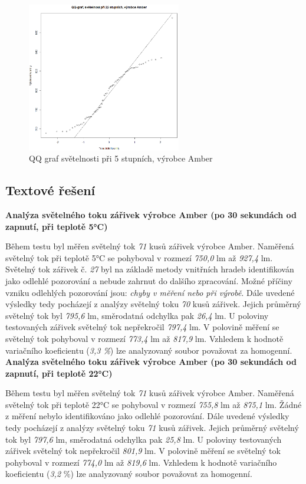 \documentclass[czech]{article}%
\begin{document}
\begin{figure}[H]
	\centering
	\includegraphics[width=0.6\textwidth]{Figures/QQ22.png}
	\caption[QQ graf světelnosti 5C, Amber]{QQ graf světelnosti při 5 stupních, výrobce Amber}
	\label{fig:QQ22}
\end{figure}

\newpage
\subsection{Textové řešení}

\textbf{Analýza světelného toku zářivek výrobce Amber (po 30 sekundách od zapnutí, při teplotě 5°C)}

Během testu byl měřen světelný tok \textit{71} kusů zářivek výrobce Amber. 
Naměřená světelný tok při teplotě 5°C se pohyboval v rozmezí \textit{750,0} lm až \textit{927,4} lm. 
Světelný tok zářivek č. \textit{27} byl na základě metody vnitřních hradeb identifikován jako 
odlehlé pozorování a nebude zahrnut do dalšího zpracování. Možné příčiny vzniku odlehlých pozorování jsou: \textit{chyby v měření nebo při výrobě}. 
Dále uvedené výsledky tedy pocházejí z analýzy světelný toku \textit{70} kusů zářivek. Jejich průměrný světelný tok byl \textit{795,6} lm, 
směrodatná odchylka pak \textit{26,4} lm. U poloviny testovaných zářivek světelný tok nepřekročil \textit{797,4} lm. 
V polovině měření se světelný tok pohyboval v rozmezí \textit{773,4} lm až \textit{817,9} lm. 
Vzhledem k hodnotě variačního koeficientu (\textit{3,3 \%}) lze analyzovaný soubor považovat za homogenní.\\


\textbf{Analýza světelného toku zářivek výrobce Amber (po 30 sekundách od zapnutí, při teplotě 22°C)}

Během testu byl měřen světelný tok \textit{71} kusů zářivek výrobce Amber. 
Naměřená světelný tok při teplotě 22°C se pohyboval v rozmezí \textit{755,8} lm až \textit{875,1} lm. 
Žádné z měření nebylo identifikováno jako odlehlé pozorování. 
Dále uvedené výsledky tedy pocházejí z analýzy světelný toku \textit{71} kusů zářivek. Jejich průměrný světelný tok byl \textit{797,6} lm, 
směrodatná odchylka pak \textit{25,8} lm. U poloviny testovaných zářivek světelný tok nepřekročil \textit{801,9} lm. 
V polovině měření se světelný tok pohyboval v rozmezí  \textit{774,0} lm až \textit{819,6} lm. 
Vzhledem k hodnotě variačního koeficientu (\textit{3,2} \%) lze analyzovaný soubor považovat za homogenní.\\
\end{document}
